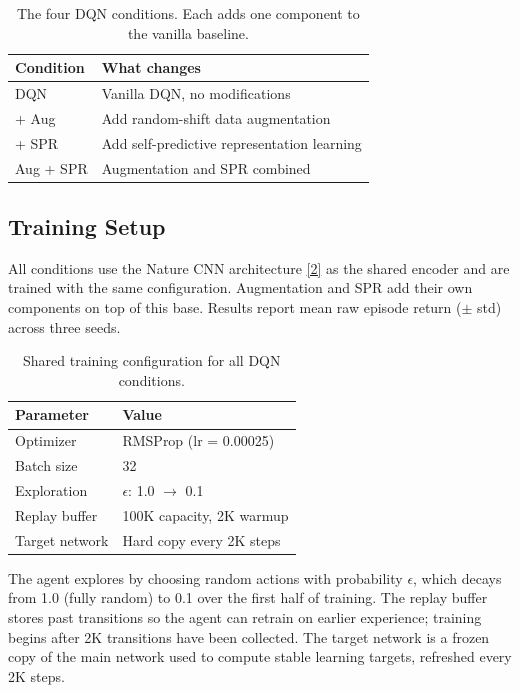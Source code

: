 \documentclass[11pt]{article}
\newcommand{\citelink}[2]{\href{#1}{\small[#2]}}
\begin{document}
\begin{table}[H]
\centering
\renewcommand{\arraystretch}{1.5}
\setlength{\tabcolsep}{12pt}
\begin{tabular}{l l}
\toprule
\textbf{Condition} & \textbf{What changes} \\
\midrule
DQN       & Vanilla DQN, no modifications \\
+ Aug     & Add random-shift data augmentation \\
+ SPR     & Add self-predictive representation learning \\
Aug + SPR & Augmentation and SPR combined \\
\bottomrule
\end{tabular}
\caption{The four DQN conditions. Each adds one component to the
vanilla baseline.}
\end{table}

\subsection{Training Setup}

All conditions use the Nature CNN architecture
\citelink{https://www.nature.com/articles/nature14236}{2} as the shared
encoder and are trained with the same configuration. Augmentation and
SPR add their own components on top of this base. Results report mean
raw episode return ($\pm$ std) across three seeds.

\begin{table}[H]
\centering
\renewcommand{\arraystretch}{1.5}
\setlength{\tabcolsep}{12pt}
\begin{tabular}{l l}
\toprule
\textbf{Parameter} & \textbf{Value} \\
\midrule
Optimizer       & RMSProp (lr = 0.00025) \\
Batch size      & 32 \\
Exploration     & $\epsilon$: 1.0 $\to$ 0.1 \\
Replay buffer   & 100K capacity, 2K warmup \\
Target network  & Hard copy every 2K steps \\
\bottomrule
\end{tabular}
\caption{Shared training configuration for all DQN conditions.}
\end{table}

\noindent The agent explores by choosing random actions with probability
$\epsilon$, which decays from 1.0 (fully random) to 0.1 over the first
half of training. The replay buffer stores past transitions so the agent
can retrain on earlier experience; training begins after 2K transitions
have been collected. The target network is a frozen copy of the main
network used to compute stable learning targets, refreshed every 2K
steps.
\end{document}
